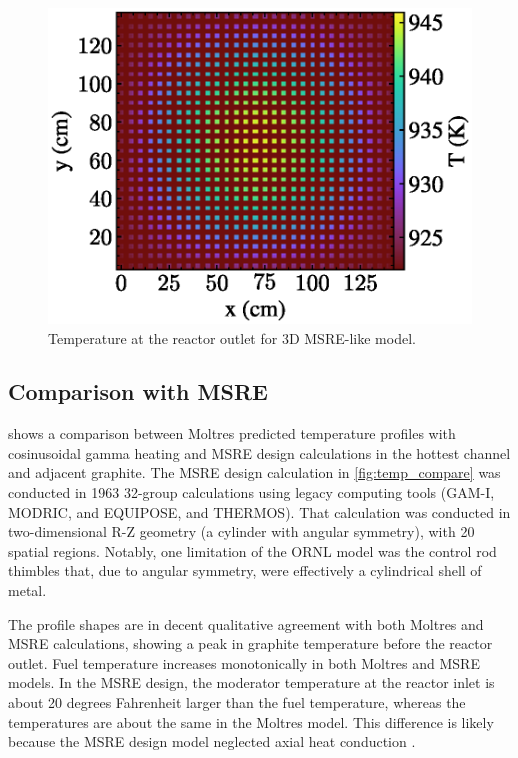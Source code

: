 \documentclass{article}
\let\Oldsubsection\subsection
\renewcommand{\subsection}{\FloatBarrier\Oldsubsection}
\begin{document}
\begin{figure}[htpb]
  \centering
  \includegraphics{3d_gamma_heating_z_slice_temp.eps}
        \caption{Temperature at the reactor outlet for 3D \gls{MSRE}-like
          model.}
  \label{fig:3d_temp_fuel_outlet}
\end{figure}



\subsection{Comparison with \gls{MSRE}}

 shows a comparison between Moltres predicted temperature
profiles with cosinusoidal gamma heating and \gls{MSRE} design calculations
\cite{briggs_molten-salt_1964} in the hottest channel and adjacent graphite. 
The \gls{MSRE} design calculation in \cref{fig:temp_compare} was conducted in 
1963
32-group calculations using legacy computing tools (GAM-I, MODRIC, and 
EQUIPOSE, and THERMOS). That calculation was conducted in two-dimensional R-Z 
geometry (a cylinder with angular symmetry), with 20 spatial regions. Notably, 
one limitation of the \gls{ORNL} model was the control rod thimbles that, due to 
angular symmetry, were effectively a cylindrical shell of metal.

The profile shapes are in decent qualitative agreement with both Moltres and
\gls{MSRE} calculations, showing a peak in graphite temperature before the
reactor outlet. Fuel temperature increases monotonically in both Moltres and
\gls{MSRE} models. In the \gls{MSRE} design, the moderator
temperature at the reactor inlet is about 20 degrees Fahrenheit larger than the
fuel temperature, whereas the temperatures are about the same in the Moltres
model. This difference is likely because the \gls{MSRE} design model 
neglected axial heat conduction \cite[p. 99]{briggs_molten-salt_1964}.
\end{document}
